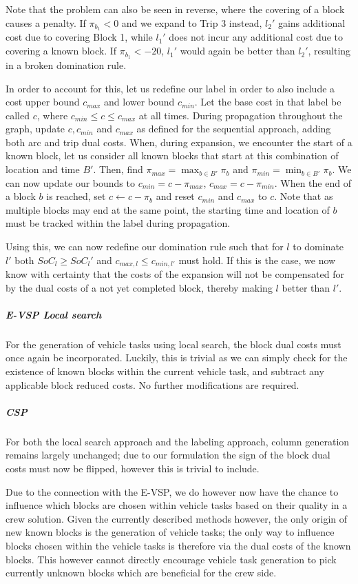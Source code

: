 \documentclass[]{article}
\begin{document}
Note that the problem can also be seen in reverse, where the covering of a block causes a penalty. If $\pi_{b_1} < 0$ and we expand to Trip 3 instead, $l_2'$ gains additional cost due to covering Block 1, while $l_1'$ does not incur any additional cost due to covering a known block. If $\pi_{b_1} < -20$, $l_1'$ would again be better than $l_2'$, resulting in a broken domination rule.  

In order to account for this, let us redefine our label in order to also include a cost upper bound $c_{max}$ and lower bound $c_{min}$. Let the base cost in that label be called $c$, where $c_{min} \leq c \leq c_{max}$ at all times. During propagation throughout the graph, update $c, c_{min}$ and $c_{max}$ as defined for the sequential approach, adding both arc and trip dual costs. When, during expansion, we encounter the start of a known block, let us consider all known blocks that start at this combination of location and time $B'$. Then, find $\pi_{max} = \max_{b \in B'} \pi_{b}$ and $\pi_{min} = \min_{b \in B'} \pi_{b}$. We can now update our bounds to $c_{min} = c - \pi_{max}$, $c_{max} = c - \pi_{min}$. When the end of a block $b$ is reached, set $c \gets c - \pi_b$ and reset $c_{min}$ and $c_{max}$ to $c$. Note that as multiple blocks may end at the same point, the starting time and location of $b$ must be tracked within the label during propagation. 

Using this, we can now redefine our domination rule such that for $l$ to dominate $l'$ both $SoC_l \geq SoC_l'$ and $c_{max,l} \leq c_{min,l'}$ must hold. If this is the case, we now know with certainty that the costs of the expansion will not be compensated for by the dual costs of a not yet completed block, thereby making $l$ better than $l'$.

\noindent \subparagraph{E-VSP Local search} For the generation of vehicle tasks using local search, the block dual costs must once again be incorporated. Luckily, this is trivial as we can simply check for the existence of known blocks within the current vehicle task, and subtract any applicable block reduced costs. No further modifications are required.

\subparagraph{CSP} For both the local search approach and the labeling approach, column generation remains largely unchanged; due to our formulation the sign of the block dual costs must now be flipped, however this is trivial to include. 

Due to the connection with the E-VSP, we do however now have the chance to influence which blocks are chosen within vehicle tasks based on their quality in a crew solution. Given the currently described methods however, the only origin of new known blocks is the generation of vehicle tasks; the only way to influence blocks chosen within the vehicle tasks is therefore via the dual costs of the known blocks. This however cannot directly encourage vehicle task generation to pick currently unknown blocks which are beneficial for the crew side. 
\end{document}
